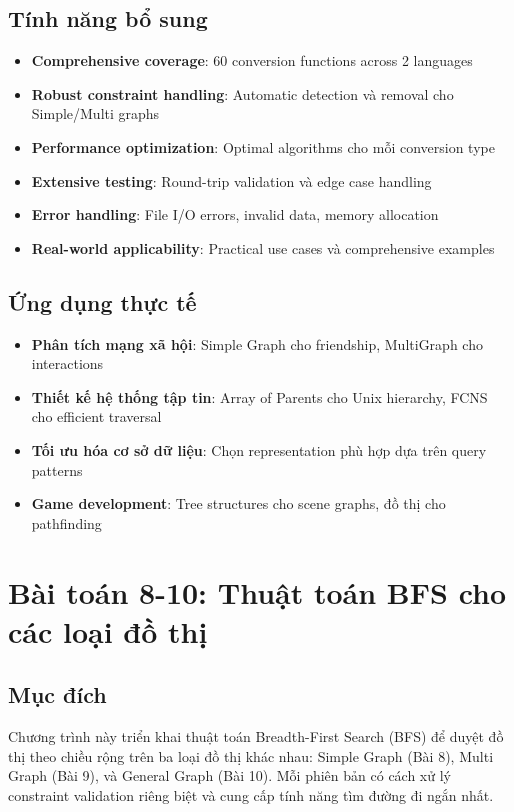 \documentclass[12pt]{article}
\begin{document}
\subsection*{Tính năng bổ sung}
\begin{itemize}
  \item \textbf{Comprehensive coverage}: 60 conversion functions across 2 languages
  \item \textbf{Robust constraint handling}: Automatic detection và removal cho Simple/Multi graphs
  \item \textbf{Performance optimization}: Optimal algorithms cho mỗi conversion type
  \item \textbf{Extensive testing}: Round-trip validation và edge case handling
  \item \textbf{Error handling}: File I/O errors, invalid data, memory allocation
  \item \textbf{Real-world applicability}: Practical use cases và comprehensive examples
\end{itemize}

\subsection*{Ứng dụng thực tế}
\begin{itemize}
  \item \textbf{Phân tích mạng xã hội}: Simple Graph cho friendship, MultiGraph cho interactions
  \item \textbf{Thiết kế hệ thống tập tin}: Array of Parents cho Unix hierarchy, FCNS cho efficient traversal
  \item \textbf{Tối ưu hóa cơ sở dữ liệu}: Chọn representation phù hợp dựa trên query patterns
     \item \textbf{Game development}: Tree structures cho scene graphs, đồ thị cho pathfinding
 \end{itemize}


\section*{Bài toán 8-10: Thuật toán BFS cho các loại đồ thị}

\subsection*{Mục đích}
Chương trình này triển khai thuật toán Breadth-First Search (BFS) để duyệt đồ thị theo chiều rộng trên ba loại đồ thị khác nhau: Simple Graph (Bài 8), Multi Graph (Bài 9), và General Graph (Bài 10). Mỗi phiên bản có cách xử lý constraint validation riêng biệt và cung cấp tính năng tìm đường đi ngắn nhất.
\end{document}
